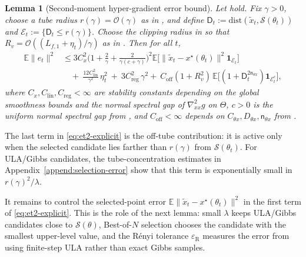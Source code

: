 \documentclass{article}
\theoremstyle{normaltheorem}
\newtheorem{lemma}[lemma]{Lemma}
\newcommand{\calS}{\mathcal{S}}
\begin{document}
\begin{lemma}[Second-moment hyper-gradient error bound]\label{thm:et2-bound}
Let  hold.
Fix \(\gamma>0\), choose a tube radius \(r(\gamma)=\mathcal{O}(\gamma)\) as in , and define
\(\mathsf{D}_{t}:=\mathrm{dist}(\tilde x_t,\calS(\theta_t))\) and
\(\mathcal E_t:=\{\mathsf{D}_{t}\le r(\gamma)\}\).
Choose the clipping radius in  so that
\(R_v=\mathcal{O}((L_{f,1}+\eta_t)/\gamma)\) as in .
Then for all \(t\),
\begin{equation}\label{eq:et2-explicit}
\begin{aligned}
\mathbb E\|e_t\|^2
&\le
3C_x^2\Big(1+\tfrac{2}{\gamma}+\tfrac{2}{\gamma(c+\gamma)}\Big)^{\!2}
\mathbb E\big[\|\tilde x_t-x^\star(\theta_t)\|^2\mathbf 1_{\mathcal E_t}\big]\\
&\quad+\ \tfrac{12C_{\mathrm{lin}}^2}{\gamma^2}\,\eta_t^2
\ +\ 3C_{\mathrm{reg}}^2\,\gamma^2+\ C_{\mathrm{off}}(1+R_v^2)\,
\mathbb E\big[(1+\mathsf{D}_{t}^{2\mathsf n_{\theta x}})\mathbf 1_{\mathcal E_t^c}\big],
\end{aligned}
\end{equation}
where \(C_x,C_{\mathrm{lin}},C_{\mathrm{reg}}<\infty\) are stability constants depending on the global smoothness bounds
and the normal spectral gap of \(\nabla^2_{xx}g\) on \(\Theta\), \(c>0\) is the uniform normal spectral gap from
, and \(C_{\mathrm{off}}<\infty\) depends on
\(C_{\theta x},D_{\theta x},\mathsf n_{\theta x}\) from .
\end{lemma}

The last term in \eqref{eq:et2-explicit} is the off-tube contribution: it is active only when the selected candidate lies
farther than \(r(\gamma)\) from \(\calS(\theta_t)\). For ULA/Gibbs candidates, the tube-concentration estimates in
Appendix~\ref{append:selection-error} show that this term is exponentially small in \(r(\gamma)^2/\lambda\). 

It remains to control the selected-point error
\(\mathbb E\|\tilde x_t-x^\star(\theta_t)\|^2\) in the first term of \eqref{eq:et2-explicit}. This is the role of the
next lemma: small \(\lambda\) keeps ULA/Gibbs candidates close to \(\calS(\theta)\), Best-of-\(N\) selection chooses the
candidate with the smallest upper-level value, and the R\'enyi tolerance \(\varepsilon_{\mathrm R}\) measures the error
from using finite-step ULA rather than exact Gibbs samples.
\end{document}
